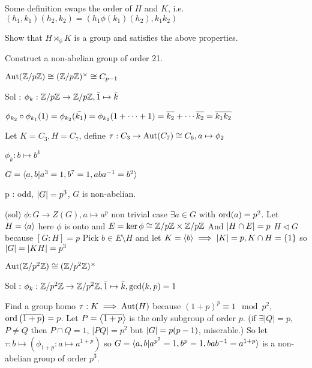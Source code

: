 \begin{remark}
Some definition swaps the order of $H$ and $K$, i.e. $(h_1, k_1) (h_2, k_2) = (h_1 \phi(k_1)(h_2), k_1 k_2)$
\end{remark}

\begin{exercise}
Show that $H \rtimes_\phi K$ is a group and satisfies the above properties.
\end{exercise}

\begin{example}
Construct a non-abelian group of order 21.
\end{example}

\begin{fact}
  $\Aut(\quot{\Zb}{p\Zb}) \cong (\quot{\Zb}{p\Zb})^\times \cong C_{p-1}$
\end{fact}
Sol : $\phi_k: \quot{\Zb}{p\Zb} \to \quot{\Zb}{p\Zb}, \bar{1} \mapsto \bar{k}$

$\phi_{k_2} \circ \phi_{k_1} (1) = \phi_{k_2}(\bar{k_1}) = \phi_{k_2}(1+\cdots+1)
= \ob{k_2} + \cdots \ob{k_2} = \ob{k_1 k_2}$

Let $K = C_3, H = C_7$, define $\tau : C_3 \to \Aut(C_7) \cong C_6, a \mapsto \phi_2$

$\phi_k : b \mapsto b^k$

$G = \gen{a, b | a^3=1, b^7=1, aba^{-1}=b^2}$

\begin{example}
  p : odd, $\abs{G} = p^3$, $G$ is non-abelian.
\end{example}
(sol)
$\phi: G \to Z(G), a \mapsto a^p$ non trivial
case $\exists a \in G $ with $\ord(a) = p^2$.
Let $H = \gen{a}$ here $\phi$ is onto and $E = \ker \phi \cong \quot{\Zb}{p\Zb} \times \quot{\Zb}{p\Zb}$
And $\abs{H \cap E} = p$
$H \lhd G$ because $[G: H]=p$
Pick $b \in E \setminus H$ and let $K = \gen{b} \implies \abs{K} = p, K \cap H = \{1\}$
so $\abs{G} = \abs{KH} = p^3$

\begin{fact}
  $\Aut(\quot{\Zb}{p^2 \Zb}) \cong (\quot{\Zb}{p^2 \Zb})^\times$
\end{fact}
Sol : $\phi_k: \quot{\Zb}{p^2\Zb} \to \quot{\Zb}{p^2\Zb}, \bar{1} \mapsto \bar{k}, \gcd(k, p) = 1$

Find a group homo $\tau : K \implies \Aut(H)$
because $(1+p)^p \equiv 1 \mod p^2$, $\ord\left(\ob{1+p}\right) = p$.
Let $P = \gen*{\ob{1+p}}$ is the only subgroup of order $p$.
(if $\exists |Q| = p$, $P \neq Q$ then $P \cap Q = 1$, $|PQ| = p^2$ but $\abs{G} = p (p-1)$, miserable.)
So let $\tau : b \mapsto (\phi_{1+p} : a \mapsto a^{1+p})$
so $G = \gen{a, b | a^{p^2}=1, b^p = 1, bab^{-1} = a^{1+p}}$ is a non-abelian group of order $p^3$.

